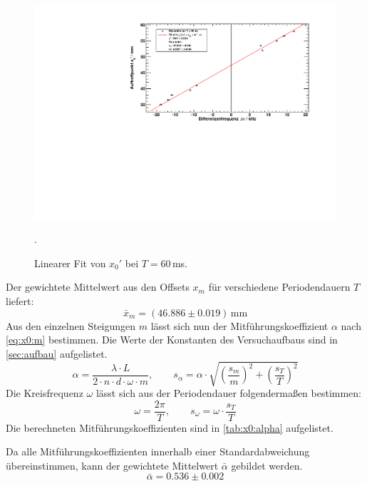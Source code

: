 \begin{figure}[H]
\begin{center}
  \includegraphics[width=\textwidth]{../img/fit_T_60ms.pdf}
  \caption{Linearer Fit von $x_0'$ bei $T = 60$\,ms.}.
  \label{img:fit:x0:60ms}
\end{center}
\end{figure}



Der gewichtete Mittelwert aus den Offsets $x_m$ für verschiedene Periodendauern $T$ liefert:
\begin{equation}
  \label{eq:xm}
  \bar{x}_{m} = (46.886 \pm 0.019)\,\text{mm}
\end{equation}
Aus den einzelnen Steigungen $m$ lässt sich nun der Mitführungskoeffizient $\alpha$ nach \autoref{eq:x0:m} bestimmen. Die Werte der Konstanten des 
Versuchaufbaus sind in \autoref{sec:aufbau} aufgelistet.
\begin{equation}
  \alpha = \frac{\lambda \cdot L}{2 \cdot n \cdot d \cdot \omega \cdot m}, \qquad
  s_{\alpha} = \alpha \cdot \sqrt{\left(\frac{s_m}{m}\right)^2 + \left(\frac{s_T}{T}\right)^2}
\end{equation}
Die Kreisfrequenz $\omega$ lässt sich aus der Periodendauer folgendermaßen bestimmen:
\begin{equation}
  \label{eq:omega}
  \omega = \frac{2 \pi}{T}, \qquad s_{\omega} = \omega \cdot \frac{s_T}{T}
\end{equation}
Die berechneten Mitführungskoeffizienten sind in \autoref{tab:x0:alpha} aufgelistet.

Da alle Mitführungskoeffizienten innerhalb einer Standardabweichung übereinstimmen, kann der gewichtete Mittelwert $\bar{\alpha}$ gebildet werden.
\begin{equation}
  \label{eq:x0:alpha:avg}
  \bar{\alpha} = 0.536 \pm 0.002
\end{equation}

